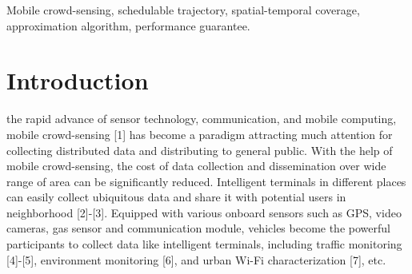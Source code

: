 \documentclass[journal]{IEEEtran}
\begin{document}
\begin{IEEEkeywords}
Mobile crowd-sensing, schedulable trajectory, spatial-temporal coverage, approximation algorithm, performance guarantee.
\end{IEEEkeywords}






%
\IEEEpeerreviewmaketitle



\section{Introduction}

% 
% 
% 
% 
 the rapid advance of sensor technology, communication, and mobile computing, mobile crowd-sensing [1] has become a paradigm attracting much attention for collecting distributed data and distributing to general public. With the help of mobile crowd-sensing, the cost of data collection and dissemination over wide range of area can be significantly reduced. Intelligent terminals in different places can easily collect ubiquitous data and share it with potential users in neighborhood [2]-[3]. Equipped with various onboard sensors such as GPS, video cameras, gas sensor and communication module, vehicles become the powerful participants to collect data like intelligent terminals, including traffic monitoring [4]-[5], environment monitoring [6], and urban Wi-Fi characterization [7], etc. 
\end{document}
